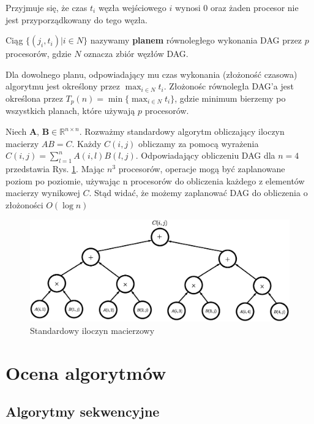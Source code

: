 Przyjmuje się, że czas \(t_i\) węzła wejściowego \(i\) wynosi 0 oraz żaden procesor nie jest przyporządkowany do tego węzła.\\
\begin{definicja}[Plan]\label{def:plan}
Ciąg \(\{(j_i, t_i) | i\in N\}\) nazywamy \textbf{planem} równoległego wykonania DAG przez \(p\) procesorów, gdzie \(N\) oznacza zbiór węzłów DAG.
\end{definicja}
Dla dowolnego planu, odpowiadający mu czas wykonania (złożoność czasowa) algorytmu jest określony przez \(\max_{i\in N}t_i\). Złożonośc równoległa DAG'a jest określona przez \(T_{p}(n) = \min{\{\max_{i\in N}t_i\}}\), gdzie minimum bierzemy po wszystkich planach, które używają \(p\) procesorów.


\begin{przyklad}
Niech \(\mathbf{A}\), \(\mathbf{B}\in\mathbb{R}^{n\times n}\). Rozważmy standardowy algorytm obliczający iloczyn macierzy \(AB = C\). Każdy \(C(i, j)\) obliczamy za pomocą wyrażenia \(C(i, j)=\sum_{l=1}^{n}A(i,l)B(l,j)\). Odpowiadający obliczeniu DAG dla \(n=4\) przedstawia Rys. \ref{fig:standard_parallel}. Mając \(n^3\) procesorów, operacje mogą być zaplanowane poziom po poziomie, używając n procesorów do obliczenia każdego z elementów macierzy wynikowej \(C\). Stąd widać, że możemy zaplanować DAG do obliczenia o złożoności \(O(\log{n})\)
\begin{figure}[H]
\centering
\includegraphics[width=36em]{./images/Rys3.eps}
\caption{Standardowy iloczyn macierzowy}
\label{fig:standard_parallel}
\end{figure}

\end{przyklad}

\section{Ocena algorytmów}
\label{subsec:algorytmy_sekwencyjne}
\subsection{Algorytmy sekwencyjne}

